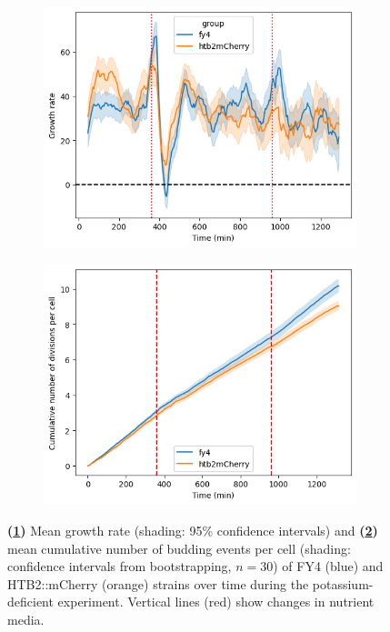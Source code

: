 \begin{figure}
  \centering
  \begin{subfigure}[htpb]{0.45\textwidth}
   \centering
   \includegraphics[width=\textwidth]{allstrains_613_gr}
   \caption{
   }
   \label{fig:biology-kdeficient-gr}
  \end{subfigure}%
  \begin{subfigure}[htpb]{0.45\textwidth}
   \centering
   \includegraphics[width=\textwidth]{allstrains_613_cumul}
   \caption{
   }
   \label{fig:biology-kdeficient-cumul}
  \end{subfigure}

  \caption{
    \textbf{(\ref{fig:biology-kdeficient-gr})}
    Mean growth rate (shading: 95\% confidence intervals) and
    \textbf{(\ref{fig:biology-kdeficient-cumul})}
    mean cumulative number of budding events per cell (shading: confidence intervals from bootstrapping, $n=30$)
    of FY4 (blue) and HTB2::mCherry (orange) strains over time during the potassium-deficient experiment.
    Vertical lines (red) show changes in nutrient media.
  }
  \label{fig:biology-kdeficient-gr-budprob}
\end{figure}

